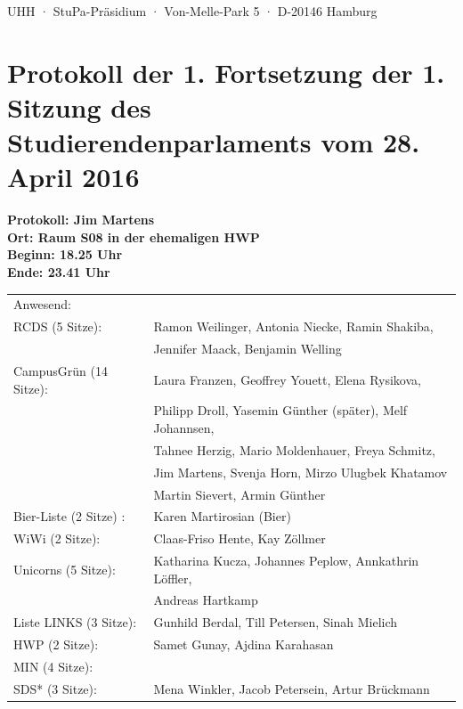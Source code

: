 \documentclass[ngerman,headheight=70pt]{scrartcl}
\begin{document}
    UHH · StuPa-Präsidium · Von-Melle-Park 5 · D-20146 Hamburg

    \section*{Protokoll der 1. Fortsetzung der 1. Sitzung des Studierendenparlaments vom 28. April 2016}

    \textbf{Protokoll: Jim Martens}\\
    \textbf{Ort: Raum S08 in der ehemaligen HWP }\\
    \textbf{Beginn: 18.25 Uhr}\\
    \textbf{Ende: 23.41 Uhr}

    \vspace{0.5cm}
    \begin{tabular}{ll}
        Anwesend: & \\
            RCDS (5 Sitze): & Ramon Weilinger, Antonia Niecke, Ramin Shakiba, \\
                            & Jennifer Maack, Benjamin Welling \\
             CampusGrün (14 Sitze): & Laura Franzen, Geoffrey Youett, Elena Rysikova, \\
                                   & Philipp Droll, Yasemin Günther (später), Melf Johannsen,\\
                                   & Tahnee Herzig, Mario Moldenhauer, Freya Schmitz, \\
                                   & Jim Martens, Svenja Horn, Mirzo Ulugbek Khatamov \\
                                   & Martin Sievert, Armin Günther \\
             Bier-Liste (2 Sitze) : & Karen Martirosian (Bier) \\
             WiWi (2 Sitze): & Claas-Friso Hente, Kay Zöllmer \\
             Unicorns (5 Sitze): & Katharina Kucza, Johannes Peplow, Annkathrin Löffler, \\
                                 & Andreas Hartkamp \\
             Liste LINKS (3 Sitze): & Gunhild Berdal, Till Petersen, Sinah Mielich \\
             HWP (2 Sitze): & Samet Gunay, Ajdina Karahasan \\
             MIN (4 Sitze): &  \\
             SDS* (3 Sitze): & Mena Winkler, Jacob Petersein, Artur Brückmann \\

\end{tabular}
\end{document}

